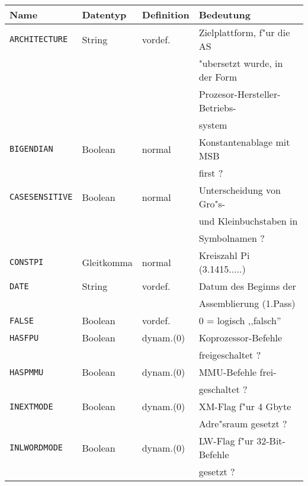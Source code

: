 \documentclass[12pt,a4paper,twoside]{report}
\newcommand{\tty}[1]{{\tt #1}}
\begin{document}
\begin{center}\begin{longtable}{|l|l|l|l|}
\hline
Name             &  Datentyp   & Definition & Bedeutung \\
\hline\hline
\endhead
\tty{ARCHITECTURE} & String    & vordef.    & Zielplattform, f"ur die AS \\
                 &             &            & "ubersetzt wurde, in der Form \\
                 &             &            & Prozesor-Hersteller-Betriebs- \\
                 &             &            & system \\
\hline
\tty{BIGENDIAN}  &  Boolean    & normal     & Konstantenablage mit MSB \\
                 &             &            & first ? \\
\hline
\tty{CASESENSITIVE} & Boolean  & normal     & Unterscheidung von Gro"s- \\
                 &             &            & und Kleinbuchstaben in \\
                 &             &            & Symbolnamen ? \\
\hline
\tty{CONSTPI}    &  Gleitkomma & normal     & Kreiszahl Pi (3.1415.....) \\
\hline
\tty{DATE}       &  String     & vordef.    & Datum des Beginns der  \\
                 &             &            & Assemblierung (1.Pass) \\
\hline
\tty{FALSE}      &  Boolean    & vordef.    & 0 = logisch ,,falsch'' \\
\hline
\tty{HASFPU}     &  Boolean    & dynam.(0)  & Koprozessor-Befehle \\
                 &             &            & freigeschaltet ? \\
\hline
\tty{HASPMMU}    &  Boolean    & dynam.(0)  & MMU-Befehle frei- \\
                 &             &            & geschaltet ? \\
\hline
\tty{INEXTMODE}  &  Boolean    & dynam.(0)  & XM-Flag f"ur 4 Gbyte \\
                 &             &            & Adre"sraum gesetzt ? \\
\hline
\tty{INLWORDMODE} & Boolean    & dynam.(0)  & LW-Flag f"ur 32-Bit-Befehle \\
                 &             &            & gesetzt ? \\

\end{longtable}
\end{center}
\end{document}
